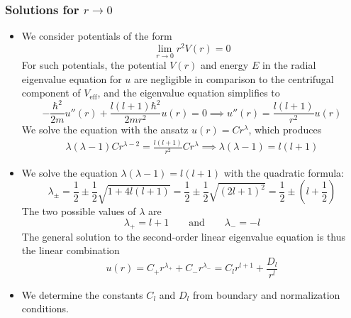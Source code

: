 \documentclass[11pt, a4paper]{article}
\newcommand{\eqtext}[1]{\qquad \text{#1} \qquad}
\begin{document}
\subsubsection{Solutions for $ r \to 0 $}
\begin{itemize}
	\item We consider potentials of the form
	\begin{equation*}
		\lim_{r \to 0}r^{2}V(r) = 0
	\end{equation*}
	For such potentials, the potential $ V(r) $ and energy $ E $ in the radial eigenvalue equation for $ u $ are negligible in comparison to the centrifugal component of $ V_{\text{eff}} $, and the eigenvalue equation simplifies to
	\begin{equation*}
		-\frac{\hbar^{2}}{2m}u''(r) + \frac{l (l+1)\hbar^{2}}{2mr^{2}}u(r) = 0 \implies u''(r) = \frac{l (l+1)}{r^{2}}u(r)
	\end{equation*}
	We solve the equation with the ansatz $ u(r) = Cr^{\lambda} $, which produces
	\begin{align*}
		\lambda (\lambda - 1)Cr^{\lambda-2} = \frac{l (l+1)}{r^{2}}Cr^{\lambda} \implies 	\lambda (\lambda - 1) = l (l+1)
	\end{align*}
	
	\item We solve the equation $ \lambda (\lambda - 1) = l (l+1) $ with the quadratic formula:
	\begin{equation*}
		\lambda_{\pm} = \frac{1}{2} \pm \frac{1}{2}\sqrt{1 + 4l (l+1)} = \frac{1}{2} \pm \frac{1}{2}\sqrt{(2l+1)^{2}}  = \frac{1}{2} \pm \left(l + \frac{1}{2}\right)
	\end{equation*}
	The two possible values of $ \lambda $ are
	\begin{equation*}
		\lambda_{+} = l + 1 \eqtext{and} \lambda_{-} = -l
	\end{equation*}
	The general solution to the second-order linear eigenvalue equation is thus the linear combination
	\begin{equation*}
		u(r) = C_{+}r^{\lambda_{+}} + C_{-}r^{\lambda_{-}} = C_{l}r^{l+1} + \frac{D_{l}}{r^{l}}
	\end{equation*}
	
	\item We determine the constants $ C_{l} $ and $ D_{l} $ from boundary and normalization conditions. 
	

\end{itemize}
\end{document}
